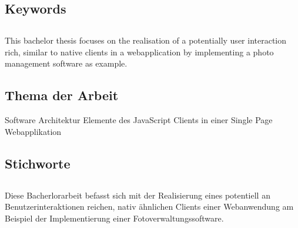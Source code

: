 \subsection*{Keywords}


\subsection*{\centering\abstractname}
This bachelor thesis focuses on the realisation of a potentially user interaction rich, similar to native clients in a webapplication by implementing a photo management software as example.


\subsection*{Thema der Arbeit}
Software Architektur Elemente des JavaScript Clients in einer Single Page Webapplikation


\subsection*{Stichworte}
\subsection*{\centering\abstractname}
Diese Bacherlorarbeit befasst sich mit der Realisierung eines potentiell an Benutzerinteraktionen reichen, nativ ähnlichen Clients einer Webanwendung am Beispiel der Implementierung einer Fotoverwaltungssoftware.

\newpage


\tableofcontents %
\newpage









\appendix



\listoffigures %
\listoflistings %
\printglossaries





\clearpage\thispagestyle{empty}
\eigen  %












